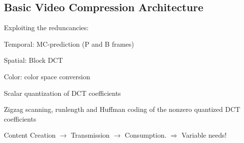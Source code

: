 \begin{compactdesc}
	\section{Basic Video Compression Architecture}
	\begin{enumerate*}[label=\protect\circled{\arabic*},itemjoin=]
		\item Exploiting the reduncancies:\\
			\begin{enumerate*}[label=\quad\protect\circled{\alph*},itemjoin=]
				\item Temporal: MC-prediction (P and B frames)\\
				\item Spatial: Block DCT\\
				\item Color: color space conversion\\
			\end{enumerate*}
		\item Scalar quantization of DCT coefficients\\
		\item Zigzag scanning, runlength and Huffman coding of the nonzero quantized DCT coefficients
	\end{enumerate*}
\item[\lp{Transimission chain}] Content Creation $\to$ Transmission $\to$ Consumption. $\Rightarrow$ Variable needs!

\end{compactdesc}
